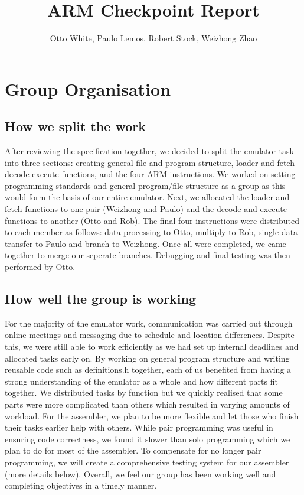 \documentclass[11pt]{article}
\begin{document}
  \title{ARM Checkpoint Report}
  \author{Otto White, Paulo Lemos, Robert Stock, Weizhong Zhao}

  \maketitle

  \section*{Group Organisation}

  \subsection*{How we split the work}

After reviewing the specification together, we decided to split the emulator task into three  sections: creating general file and program structure, loader and fetch-decode-execute functions, and the four ARM instructions. We worked on setting programming standards and general program/file structure as a group as this would form the basis of our entire emulator. Next, we allocated the loader and fetch functions to one pair (Weizhong and Paulo) and the decode and execute functions to another (Otto and Rob). The final four instructions were distributed to each member as follows: data processing to Otto, multiply to Rob, single data transfer to Paulo and branch to Weizhong. Once all were completed, we came together to merge our seperate branches. Debugging and final testing was then performed by Otto.

  \subsection*{How well the group is working}

For the majority of the emulator work, communication was carried out through online meetings and messaging due to schedule and location differences. Despite this, we were still able to work efficiently as we had set up internal deadlines and allocated tasks early on. By working on general program structure and writing reusable code such as definitions.h together, each of us benefited from having a strong understanding of the emulator as a whole and how different parts fit together. We distributed tasks by function but we quickly realised that some parts were more complicated than others which resulted in varying amounts of workload. For the assembler, we plan to be more flexible and let those who finish their tasks earlier help with others. While pair programming was useful in ensuring code correctness, we found it slower than solo programming which we plan to do for most of the assembler. To compensate for no longer pair programming, we will create a comprehensive testing system for our assembler (more details below). Overall, we feel our group has been working well and completing objectives in a timely manner.
\end{document}
